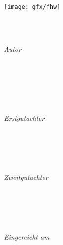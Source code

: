\begin{titlepage}
	\tgherosfont
	\centering

	\texttt{[image: gfx/fhw]} \\

	\vfill
  \begin{minipage}[t]{.8\textwidth}
    \centering
    {\LARGE \color{ctcolortitle}\textbf{\thesisTitle} \\[10mm]}
	  {\Large \thesisSubtitle} \\
  \end{minipage}
	\vfill
	\begin{minipage}[t]{.27\textwidth}
		\raggedleft
		\textit{Autor}
	\end{minipage}
	\hspace*{15pt}
	\begin{minipage}[t]{.65\textwidth}
		{\Large \thesisAuthor} \\
	  	{\thesisAuthorStudentNumber} \\
	  	{\thesisAuthorEmail} \\
    \end{minipage} \\[5mm]
    \begin{minipage}[t]{.27\textwidth}
		\raggedleft
		\textit{Erstgutachter}
	\end{minipage}
	\hspace*{15pt}
	\begin{minipage}[t]{.65\textwidth}
		{\Large \thesisFirstReviewer} \\
	  	{\thesisFirstReviewerEmail} \\
	\end{minipage} \\[5mm]
	\begin{minipage}[t]{.27\textwidth}
		\raggedleft
		\textit{Zweitgutachter}
	\end{minipage}
	\hspace*{15pt}
	\begin{minipage}[t]{.65\textwidth}
		{\Large \thesisSecondReviewer} \\
	  	{\thesisSecondReviewerEmail} \\
	\end{minipage} \\[10mm]
	\begin{minipage}[t]{.27\textwidth}
		\raggedleft
		\textit{Eingereicht am}
	\end{minipage}
	\hspace*{15pt}
	\begin{minipage}[t]{.65\textwidth}
		\thesisDate
	\end{minipage} \\

\end{titlepage}


